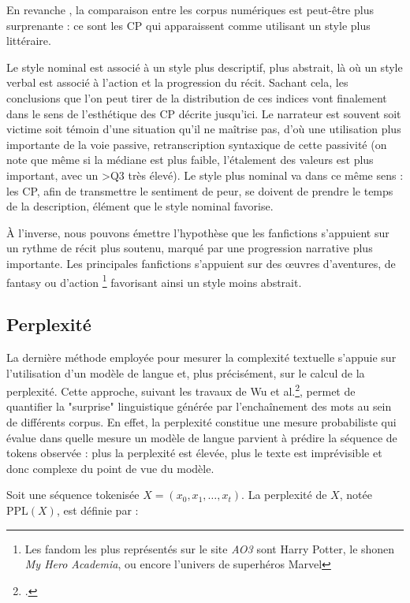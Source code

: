 \documentclass[12pt,a4paper,oneside,titlepage]{book} %
\begin{document}
En revanche , la comparaison entre les corpus numériques est peut-être plus surprenante : ce sont les CP qui apparaissent comme utilisant un style plus littéraire. 

Le style nominal est associé à un style plus descriptif, plus abstrait, là où un style verbal est associé à l'action et la progression du récit.
Sachant cela, les conclusions que l'on peut tirer de la distribution de ces indices vont finalement dans le sens de l'esthétique des CP décrite jusqu'ici. Le narrateur est souvent soit victime soit témoin d'une situation qu'il ne maîtrise pas, d'où une utilisation plus importante de la voie passive, retranscription syntaxique de cette passivité (on note que même si la médiane est plus faible, l'étalement des valeurs est plus important, avec un >Q3 très élevé).
Le style plus nominal va dans ce même sens : les CP, afin de transmettre le sentiment de peur, se doivent de prendre le temps de la description, élément que le style nominal favorise. 

À l'inverse, nous pouvons émettre l'hypothèse que les fanfictions s'appuient sur un rythme de récit plus soutenu, marqué par une progression narrative plus importante. Les principales fanfictions s'appuient sur des œuvres d'aventures, de fantasy ou d'action \footnote{Les fandom les plus représentés sur le site \textit{AO3} sont Harry Potter, le shonen \textit{My Hero Academia}, ou encore l'univers de superhéros Marvel} favorisant ainsi un style moins abstrait.



\subsection{Perplexité}


La dernière méthode employée pour mesurer la complexité textuelle s'appuie sur l'utilisation d'un modèle de langue et, plus précisément, sur le calcul de la perplexité. Cette approche, suivant les travaux de Wu et al.\footcite{wu2024perplexing}, permet de quantifier la "surprise" linguistique générée par l'enchaînement des mots au sein de différents corpus. En effet, la perplexité constitue une mesure probabiliste qui évalue dans quelle mesure un modèle de langue parvient à prédire la séquence de tokens observée : plus la perplexité est élevée, plus le texte est imprévisible et donc complexe du point de vue du modèle.

Soit une séquence tokenisée \( X = (x_0, x_1, \dots, x_t) \). La perplexité de \( X \), notée \( \text{PPL}(X) \), est définie par :
\end{document}
